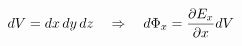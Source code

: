 \documentclass[preview]{standalone}
\begin{document}
\begin{align*}
\special{dvisvgm:raw <g id='unique000'>}dV=dx\,dy\,dz\quad\Rightarrow\quad d\Phi_x=\frac{\partial E_x}{\partial x}dV\special{dvisvgm:raw </g>}
\end{align*}
\end{document}
